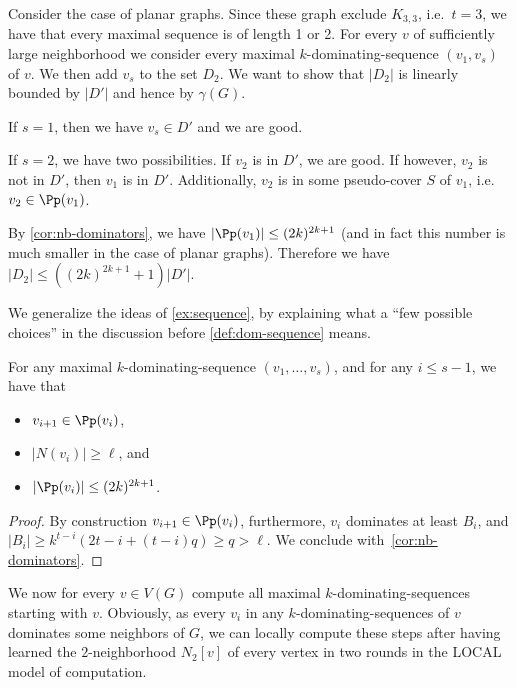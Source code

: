 \begin{example}\label{ex:sequence}
  Consider the case of planar graphs. Since these graph exclude $K_{3,3}$,
  i.e.~$t=3$, we have that every maximal sequence is of length 1 or 2.
  For every $v$ of sufficiently large neighborhood we consider every
  maximal $k$-dominating-sequence $(v_1,v_s)$ of $v$.
  We then add $v_s$ to the set $D_2$. We want to show that $|D_2|$ is
  linearly bounded by $|D'|$ and hence by $\gamma(G)$.

  If $s=1$, then we have $v_s\in D'$ and we are good.

  If $s=2$, we have two possibilities. If $v_2$ is in $D'$, we are good.
  If however, $v_2$ is not in $D'$, then $v_1$ is in
  $D'$. Additionally, $v_2$ is in some pseudo-cover $S$ of $v_1$,
  i.e.~$v_2\in \Pp(v_1)$.

  By \cref{cor:nb-dominators}, we have $|\Pp(v_1)|\le (2k)^{2k+1}$ (and
  in fact this number is much smaller in the case of planar graphs).
  Therefore we have  $|D_2| \le ((2k)^{2k+1}+1)|D'|$.
\end{example}

We generalize the ideas of \cref{ex:sequence}, by explaining what
a ``few possible choices''  in the discussion before \cref{def:dom-sequence}
means.

\begin{lemma}\label{lem:shape-sequences}
  For any maximal $k$-dominating-sequence $(v_1,\ldots,v_s)$,
  and for any $i\le s-1$, we have that
  \begin{itemize}
    \item $v_{i+1}\in \Pp(v_i)$,
    \item $|N(v_i)|\ge \ell$, and
    \item $|\Pp(v_i)|\le (2k)^{2k+1}$.
  \end{itemize}
\end{lemma}
\begin{proof}
  By construction $v_{i+1}\in \Pp(v_i)$, furthermore, $v_i$ dominates at least
  $B_i$, and
  $|B_{i}|\geq k^{t-i}(2t-i+(t-i)q) \ge q >\ell$.
  We conclude with~\cref{cor:nb-dominators}.
\end{proof}

We now for every $v\in V(G)$ compute all maximal $k$-dominating-sequences
starting with $v$.
Obviously, as every $v_i$ in any $k$-dominating-sequences of $v$ dominates some
neighbors of $G$, we can locally compute these steps after having
learned the $2$-neighborhood $N_2[v]$ of every vertex in two rounds
in the LOCAL model of computation.

